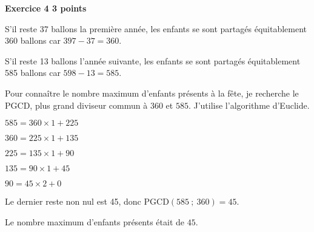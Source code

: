 \textbf{Exercice 4 \hfill 3 points}

\medskip

%
%
%
%

S’il reste 37 ballons la première année, les enfants se sont partagés équitablement 360
ballons car $397 - 37 = 360$.

S’il reste 13 ballons l'année suivante, les enfants se sont partagés équitablement 585
ballons car $598 - 13 = 585$.

Pour connaître le nombre maximum d’enfants présents à la fête, je recherche le PGCD,
plus grand diviseur commun à $360$ et $585$. J’utilise l’algorithme d’Euclide.

$585 = 360 \times 1 + 225$

$360 = 225 \times 1 + 135$

$225 =135 \times 1 + 90$

$135 = 90 \times 1 + 45$

$90 = 45 \times 2 + 0$

Le dernier reste non nul est 45, donc PGCD$(585~;~360) = 45$.

Le nombre maximum d’enfants présents était de $45$.
\vspace{0,5cm}

